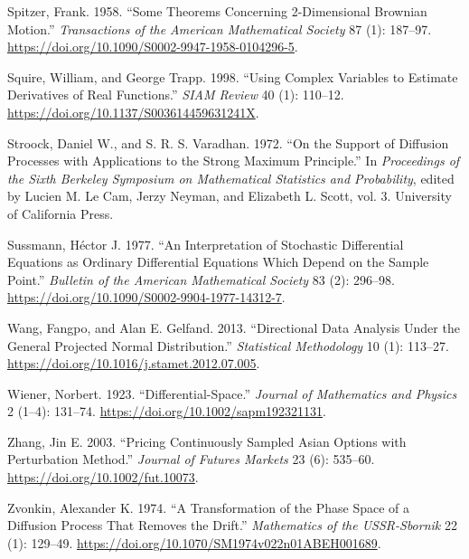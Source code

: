 \documentclass[
  english,
  10pt,
  letterpaper,
  DIV=11,
  numbers=noendperiod]{scrartcl}
\newlength{\cslhangindent}
\newenvironment{CSLReferences}[2] %
 {\begin{list}{}{%
  \setlength{\itemindent}{0pt}
  \setlength{\leftmargin}{0pt}
  \setlength{\parsep}{0pt}
  \ifodd #1
   \setlength{\leftmargin}{\cslhangindent}
   \setlength{\itemindent}{-1\cslhangindent}
  \fi
  \setlength{\itemsep}{#2\baselineskip}}}
 {\end{list}}
\theoremstyle{definition}
\theoremstyle{plain}
\theoremstyle{plain}
\theoremstyle{remark}
\begin{document}
\begin{CSLReferences}{1}{1}
Spitzer, Frank. 1958. {``Some Theorems Concerning 2-Dimensional Brownian
Motion.''} \emph{Transactions of the American Mathematical Society} 87
(1): 187--97. \url{https://doi.org/10.1090/S0002-9947-1958-0104296-5}.

Squire, William, and George Trapp. 1998. {``Using Complex Variables to
Estimate Derivatives of Real Functions.''} \emph{SIAM Review} 40 (1):
110--12. \url{https://doi.org/10.1137/S003614459631241X}.

Stroock, Daniel W., and S. R. S. Varadhan. 1972. {``On the Support of
Diffusion Processes with Applications to the Strong Maximum
Principle.''} In \emph{Proceedings of the Sixth Berkeley Symposium on
Mathematical Statistics and Probability}, edited by Lucien M. Le Cam,
Jerzy Neyman, and Elizabeth L. Scott, vol. 3. University of California
Press.

Sussmann, Héctor J. 1977. {``An Interpretation of Stochastic
Differential Equations as Ordinary Differential Equations Which Depend
on the Sample Point.''} \emph{Bulletin of the American Mathematical
Society} 83 (2): 296--98.
\url{https://doi.org/10.1090/S0002-9904-1977-14312-7}.

Wang, Fangpo, and Alan E. Gelfand. 2013. {``Directional Data Analysis
Under the General Projected Normal Distribution.''} \emph{Statistical
Methodology} 10 (1): 113--27.
\url{https://doi.org/10.1016/j.stamet.2012.07.005}.

Wiener, Norbert. 1923. {``Differential-Space.''} \emph{Journal of
Mathematics and Physics} 2 (1--4): 131--74.
\url{https://doi.org/10.1002/sapm192321131}.

Zhang, Jin E. 2003. {``Pricing Continuously Sampled Asian Options with
Perturbation Method.''} \emph{Journal of Futures Markets} 23 (6):
535--60. \url{https://doi.org/10.1002/fut.10073}.

Zvonkin, Alexander K. 1974. {``A Transformation of the Phase Space of a
Diffusion Process That Removes the Drift.''} \emph{Mathematics of the
USSR-Sbornik} 22 (1): 129--49.
\url{https://doi.org/10.1070/SM1974v022n01ABEH001689}.

\end{CSLReferences}
\end{document}
